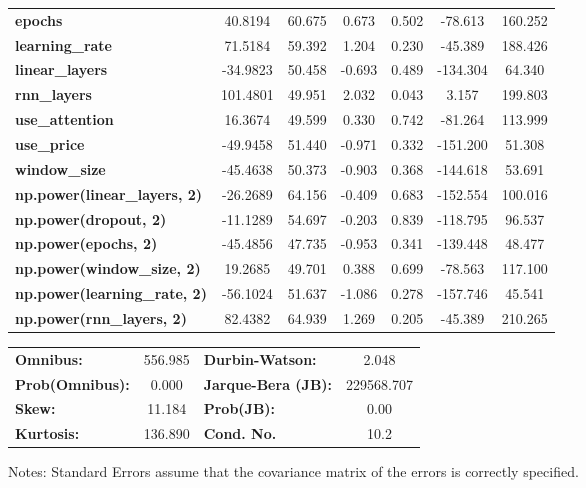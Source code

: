 \begin{center}
\begin{tabular}{lcccccc}
\textbf{epochs}                            &      40.8194  &       60.675     &     0.673  &         0.502        &      -78.613    &      160.252     \\
\textbf{learning\_rate}                    &      71.5184  &       59.392     &     1.204  &         0.230        &      -45.389    &      188.426     \\
\textbf{linear\_layers}                    &     -34.9823  &       50.458     &    -0.693  &         0.489        &     -134.304    &       64.340     \\
\textbf{rnn\_layers}                       &     101.4801  &       49.951     &     2.032  &         0.043        &        3.157    &      199.803     \\
\textbf{use\_attention}                    &      16.3674  &       49.599     &     0.330  &         0.742        &      -81.264    &      113.999     \\
\textbf{use\_price}                        &     -49.9458  &       51.440     &    -0.971  &         0.332        &     -151.200    &       51.308     \\
\textbf{window\_size}                      &     -45.4638  &       50.373     &    -0.903  &         0.368        &     -144.618    &       53.691     \\
\textbf{np.power(linear\_layers, 2)}       &     -26.2689  &       64.156     &    -0.409  &         0.683        &     -152.554    &      100.016     \\
\textbf{np.power(dropout, 2)}              &     -11.1289  &       54.697     &    -0.203  &         0.839        &     -118.795    &       96.537     \\
\textbf{np.power(epochs, 2)}               &     -45.4856  &       47.735     &    -0.953  &         0.341        &     -139.448    &       48.477     \\
\textbf{np.power(window\_size, 2)}         &      19.2685  &       49.701     &     0.388  &         0.699        &      -78.563    &      117.100     \\
\textbf{np.power(learning\_rate, 2)}       &     -56.1024  &       51.637     &    -1.086  &         0.278        &     -157.746    &       45.541     \\
\textbf{np.power(rnn\_layers, 2)}          &      82.4382  &       64.939     &     1.269  &         0.205        &      -45.389    &      210.265     \\
\bottomrule
\end{tabular}
\begin{tabular}{lclc}
\textbf{Omnibus:}       & 556.985 & \textbf{  Durbin-Watson:     } &     2.048   \\
\textbf{Prob(Omnibus):} &   0.000 & \textbf{  Jarque-Bera (JB):  } & 229568.707  \\
\textbf{Skew:}          &  11.184 & \textbf{  Prob(JB):          } &      0.00   \\
\textbf{Kurtosis:}      & 136.890 & \textbf{  Cond. No.          } &      10.2   \\
\bottomrule
\end{tabular}
\end{center}

Notes: \newline
 [1] Standard Errors assume that the covariance matrix of the errors is correctly specified.